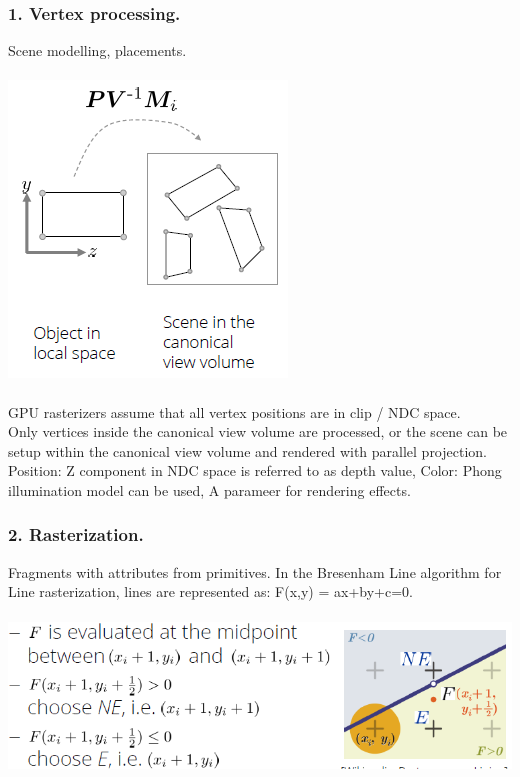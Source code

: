 \documentclass{article}
\begin{document}
\subsubsection{1. Vertex processing.}
Scene modelling, placements.\\\\
\includegraphics[scale=0.6]{image54.png}\\\\
GPU rasterizers assume that all vertex positions are in clip / NDC space.\\
Only vertices inside the canonical view volume are processed, or the scene can be setup within the canonical view volume and rendered with parallel projection.\\
Position: Z component in NDC space is referred to as depth value, Color: Phong illumination model can be used, A parameer for rendering effects.\\\subsubsection{2. Rasterization.}
Fragments with attributes from primitives. In the Bresenham Line algorithm for Line rasterization, lines are represented as: F(x,y) = ax+by+c=0.\\\\
\includegraphics[scale=0.6]{image55.png}\\\\
\end{document}
